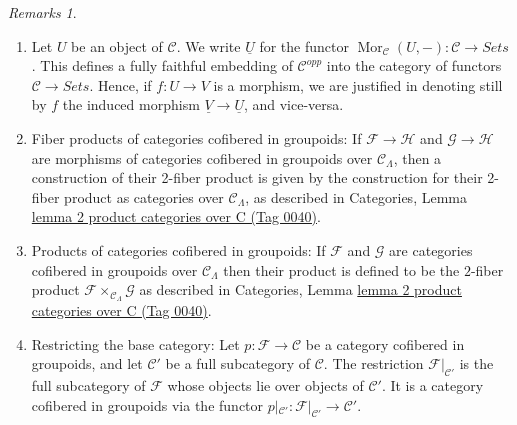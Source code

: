 \documentclass{amsart}
\theoremstyle{plain}
\theoremstyle{definition}
\theoremstyle{remark}
\newtheorem{remarks}[subsection]{Remarks}
\numberwithin{equation}{subsection}
\def\Mor{\mathop{\mathrm{Mor}}\nolimits}
\begin{document}
\begin{remarks}
\begin{enumerate}
to the category of categories cofibered in groupoids over $\mathcal{C}$.
We identify the category of functors with its image under this embedding.
Hence if $F : \mathcal{C} \to \textit{Sets}$ is a functor, we denote the
associated category cofibered in sets also by $F$; and if
$\varphi : F \to G$ is a morphism of functors, we denote still by $\varphi$
the corresponding morphism of categories cofibered in sets, and vice-versa.
See Categories, Section \href{https://stacks.math.columbia.edu/tag/0042}{section fibred in sets (Tag 0042)}.
\item
\label{item-definition-yoneda}
Let $U$ be an object of $\mathcal{C}$.  We write $\underline{U}$ for the
functor
$\Mor_\mathcal{C}(U, -): \mathcal{C} \to
\textit{Sets}$.  This defines a fully faithful embedding of $\mathcal
C^{opp}$ into the category of functors $\mathcal{C} \to
\textit{Sets}$. Hence, if $f : U \to V$ is a morphism, we are
justified in denoting still by $f$ the induced morphism $\underline{V}
\to \underline{U}$, and vice-versa.
\item
\label{item-fibre-product}
Fiber products of categories cofibered in groupoids: If $\mathcal{F}
\to \mathcal{H}$ and $\mathcal{G} \to \mathcal{H}$ are morphisms
of categories cofibered in groupoids over $\mathcal{C}_\Lambda$, then a
construction of their 2-fiber product is given by the construction for their
2-fiber product as categories over $\mathcal{C}_\Lambda$, as described in
Categories, Lemma \href{https://stacks.math.columbia.edu/tag/0040}{lemma 2 product categories over C (Tag 0040)}.
\item
\label{item-product}
Products of categories cofibered in groupoids: If $\mathcal{F}$ and
$\mathcal{G}$ are categories cofibered in groupoids over
$\mathcal{C}_\Lambda$ then their product is defined to be the $2$-fiber product
$\mathcal{F} \times_{\mathcal{C}_\Lambda} \mathcal{G}$ as described in
Categories, Lemma \href{https://stacks.math.columbia.edu/tag/0040}{lemma 2 product categories over C (Tag 0040)}.
\item
\label{item-definition-restricting-base-category}
Restricting the base category: Let $p : \mathcal{F} \to \mathcal{C}$ be a
category cofibered in groupoids, and let $\mathcal{C}'$ be a full
subcategory of $\mathcal{C}$. The restriction $\mathcal{F}|_{\mathcal{C}'}$
is the full subcategory of $\mathcal{F}$ whose objects lie over
objects of $\mathcal{C}'$. It is a category cofibered in groupoids via
the functor
$p|_{\mathcal{C}'}: \mathcal{F}|_{\mathcal{C}'} \to \mathcal{C}'$.
\end{enumerate}
\end{remarks}
\end{document}
